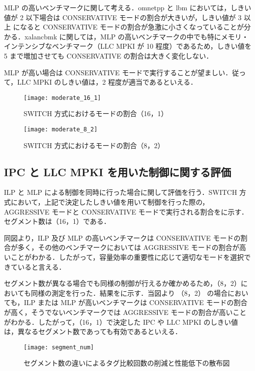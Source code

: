 MLP の高いベンチマークに関して考える．omnetpp と lbm においては，しきい値が 2 以下場合は CONSERVATIVE モードの割合が大きいが，しきい値が 3 以上 になると CONSERVATIVE モードの割合が急激に小さくなっていることが分かる．xalancbmk に関しては，MLP の高いベンチマークの中でも特にメモリ・インテンシブなベンチマーク（LLC MPKI が 10 程度）であるため，しきい値を 5 まで増加させても CONSERVATIVE の割合は大きく変化しない．

MLP が高い場合は CONSERVATIVE モードで実行することが望ましい．従って，LLC MPKI のしきい値は，2 程度が適当であるといえる．

\begin{figure}[htb]
  \centering
  \texttt{[image: moderate\_16\_1]}
  \caption{SWITCH 方式におけるモードの割合（16，1）}
  \label{fig:moderate_16_1}
\end{figure}

\begin{figure}[htb]
  \centering
  \texttt{[image: moderate\_8\_2]}
  \caption{SWITCH 方式におけるモードの割合（8，2）}
  \label{fig:moderate_8_2}
\end{figure}

\subsection{IPC と LLC MPKI を用いた制御に関する評価}
ILP と MLP による制御を同時に行った場合に関して評価を行う．SWITCH 方式において，上記で決定したしきい値を用いて制御を行った際の，AGGRESSIVE モードと CONSERVATIVE モードで実行される割合をに示す．セグメント数は（16，1）である．

同図より，ILP 及び MLP の高いベンチマークは CONSERVATIVE モードの割合が多く，その他のベンチマークにおいては AGGRESSIVE モードの割合が高いことがわかる．したがって，容量効率の重要性に応じて適切なモードを選択できていると言える．

セグメント数が異なる場合でも同様の制御が行えるか確かめるため，（8，2）においても同様の測定を行った．結果をに示す．当図より （8，2） の場合においても，ILP または MLP が高いベンチマークは CONSERVATIVE モードの割合が高く，そうでないベンチマークでは AGGRESSIVE モードの割合が高いことがわかる．したがって，（16，1）で決定した IPC や LLC MPKI のしきい値は，異なるセグメント数であっても有効であるといえる．


\begin{figure}[htb]
  \centering
  \texttt{[image: segment\_num]}
  \caption{セグメント数の違いによるタグ比較回数の削減と性能低下の散布図}
  \label{fig:segment_num}
\end{figure}

